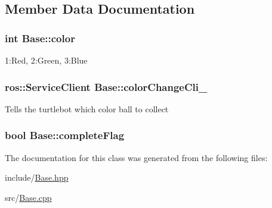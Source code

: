 \subsection{Member Data Documentation}
\subsubsection[{\texorpdfstring{color}{color}}]{\setlength{\rightskip}{0pt plus 5cm}int Base\+::color}\hypertarget{classBase_af4c79a5d92200b5adf98634163333876}{}\label{classBase_af4c79a5d92200b5adf98634163333876}
1\+:Red, 2\+:Green, 3\+:Blue 
\subsubsection[{\texorpdfstring{color\+Change\+Cli\+\_\+}{colorChangeCli_}}]{\setlength{\rightskip}{0pt plus 5cm}ros\+::\+Service\+Client Base\+::color\+Change\+Cli\+\_\+}\hypertarget{classBase_a874255744854a842b88ccab8674fca90}{}\label{classBase_a874255744854a842b88ccab8674fca90}
Tells the turtlebot which color ball to collect 
\subsubsection[{\texorpdfstring{complete\+Flag}{completeFlag}}]{\setlength{\rightskip}{0pt plus 5cm}bool Base\+::complete\+Flag}\hypertarget{classBase_a10b0afead866cc8cf2f5e2208a29d9f1}{}\label{classBase_a10b0afead866cc8cf2f5e2208a29d9f1}


The documentation for this class was generated from the following files\+:\begin{DoxyCompactItemize}
\item 
include/\hyperlink{Base_8hpp}{Base.\+hpp}\item 
src/\hyperlink{Base_8cpp}{Base.\+cpp}\end{DoxyCompactItemize}
